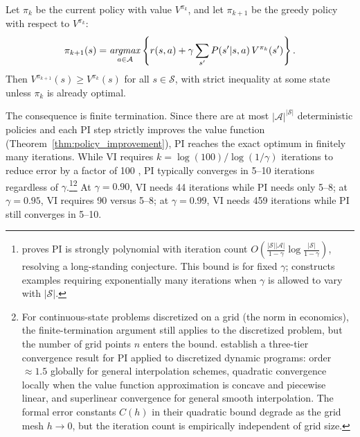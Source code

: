 \begin{theorem}
\label{thm:policy_improvement}
Let $\pi_k$ be the current policy with value $V^{\pi_k}$, and let $\pi_{k+1}$ be the greedy policy with respect to $V^{\pi_k}$:
\begin{equation}
\pi_{k+1}(s) = \mathop{\it argmax}_{a \in \mathcal{A}} \left\{ r(s,a) + \gamma \sum_{s'} P(s'|s,a)\, V^{\pi_k}(s') \right\}.
\end{equation}
Then $V^{\pi_{k+1}}(s) \geq V^{\pi_k}(s)$ for all $s \in \mathcal{S}$, with strict inequality at some state unless $\pi_k$ is already optimal.
\end{theorem}

The consequence is finite termination. Since there are at most $|\mathcal{A}|^{|\mathcal{S}|}$ deterministic policies and each PI step strictly improves the value function (Theorem~\ref{thm:policy_improvement}), PI reaches the exact optimum in finitely many iterations. While VI requires $k = \log(100) / \log(1/\gamma)$ iterations to reduce error by a factor of 100 \citep{bertsekas1996}, PI typically converges in 5--10 iterations regardless of $\gamma$.\footnote{\citet{ye2011} proves PI is strongly polynomial with iteration count $O\!\left(\frac{|\mathcal{S}||\mathcal{A}|}{1-\gamma}\log\frac{|\mathcal{S}|}{1-\gamma}\right)$, resolving a long-standing conjecture. This bound is for fixed $\gamma$; \citet{fearnley2010} constructs examples requiring exponentially many iterations when $\gamma$ is allowed to vary with $|\mathcal{S}|$.}\footnote{For continuous-state problems discretized on a grid (the norm in economics), the finite-termination argument still applies to the discretized problem, but the number of grid points $n$ enters the bound. \citet{santos2004} establish a three-tier convergence result for PI applied to discretized dynamic programs: order $\approx 1.5$ globally for general interpolation schemes, quadratic convergence locally when the value function approximation is concave and piecewise linear, and superlinear convergence for general smooth interpolation. The formal error constants $C(h)$ in their quadratic bound degrade as the grid mesh $h \to 0$, but the iteration count is empirically independent of grid size.} At $\gamma = 0.90$, VI needs 44 iterations while PI needs only 5--8; at $\gamma = 0.95$, VI requires 90 versus 5--8; at $\gamma = 0.99$, VI needs 459 iterations while PI still converges in 5--10.

